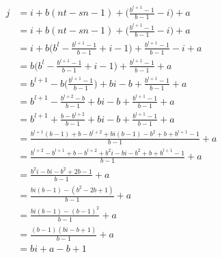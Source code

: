 \documentclass[conference]{IEEEtran}
\begin{document}
\begin{equation}
\begin{split}
j   & = i + b(nt - sn - 1) + \bigg(\frac{b^{l + 1} - 1}{b - 1} - i\bigg) + a\\
    & = i + b(nt - sn - 1) + \bigg(\frac{b^{l + 1} - 1}{b - 1} - i\bigg) + a\\
    & = i + b\bigg(b^{l} - \frac{b^{l + 1} - 1}{b - 1} + i - 1\bigg) + \frac{b^{l + 1} - 1}{b - 1} - i + a\\
    & = b\bigg(b^{l} - \frac{b^{l + 1} - 1}{b - 1} + i - 1\bigg) + \frac{b^{l + 1} - 1}{b - 1} + a\\
    & = b^{l + 1} - b\bigg(\frac{b^{l + 1} - 1}{b - 1}\bigg) + bi -b + \frac{b^{l + 1} - 1}{b - 1} + a\\
    & = b^{l + 1} - \frac{b^{l + 2} - b}{b - 1} + bi -b + \frac{b^{l + 1} - 1}{b - 1} + a\\
    & = b^{l + 1} + \frac{b - b^{l + 2}}{b - 1} + bi -b + \frac{b^{l + 1} - 1}{b - 1} + a\\
    & = \frac{b^{l + 1}(b - 1) + b - b^{l + 2} + bi(b - 1) -b^2 + b + b^{l + 1} - 1}{b - 1} + a\\
    & = \frac{b^{l + 2} - b^{l + 1} + b - b^{l + 2} + b^2i - bi -b^2 + b + b^{l + 1} - 1}{b - 1} + a\\
    & = \frac{b^2i - bi - b^2 + 2b - 1}{b - 1} + a\\
    & = \frac{bi(b - 1) - (b^2 - 2b + 1)}{b - 1} + a\\
    & = \frac{bi(b - 1) - (b - 1)^2}{b - 1} + a\\
    & = \frac{(b -1)(bi - b + 1)}{b-1} + a\\
    & = bi + a - b + 1
\end{split}
\end{equation}
\end{document}
